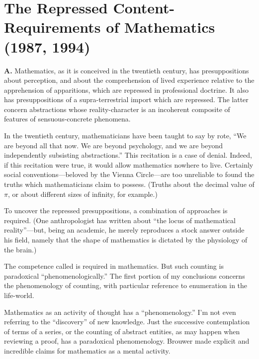 \newcommand{\jarule}{{\centering \vskip 1em \rule{0.5\textwidth}{0.5pt} \vskip 1em \par}}

\newcommand{\sectioncount}[1]{\vskip 1em \textbf{#1}.}

\chapter{The Repressed Content-Requirements of Mathematics (1987, 1994)}

\textbf{A.} Mathematics, as it is conceived in the twentieth century, has presuppositions about perception, and about the comprehension of lived experience relative to the apprehension of apparitions, which are repressed in professional doctrine. It also has presuppositions of a supra-terrestrial import which are repressed. The latter concern abstractions whose reality-character is an incoherent composite of features of sensuous-concrete phenomena.

In the twentieth century, mathematicians have been taught to say by rote, \enquote{We are beyond all that now. We are beyond psychology, and we are beyond independently subsisting abstractions.} This recitation is a case of denial. Indeed, if this recitation were true, it would allow mathematics nowhere to live. Certainly social conventions---beloved by the Vienna Circle---are too unreliable to found the truths which mathematicians claim to possess. (Truths about the decimal value of $\pi$, or about different sizes of infinity, for example.)

To uncover the repressed presuppositions, a combination of approaches is required. (One anthropologist has written about \enquote{the locus of mathematical reality}---but, being an academic, he merely reproduces a stock answer outside his field, namely that the shape of mathematics is dictated by the physiology of the brain.)

The competence called  is required in mathematics. But such counting is paradoxical \enquote{phenomenologically.} The first portion of my conclusions concerns the phenomenology of counting, with particular reference to enumeration in the life-world.

Mathematics as an activity of thought has a \enquote{phenomenology.} I'm not even referring to the \enquote{discovery} of new knowledge. Just the successive contemplation of terms of a series, or the counting of abstract entities, as may happen when reviewing a proof, has a paradoxical phenomenology. Brouwer made explicit and incredible claims for mathematics as a mental activity.

